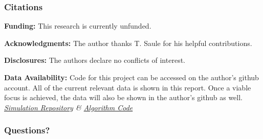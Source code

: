 \documentclass[aspectratio=169,t,xcolor=table]{beamer}
\begin{document}
\begin{frame}
    \frametitle{Citations}
    \vspace{-1.25em}
    \tiny
    \vspace{1em}
        \textbf{Funding:}
        This research is currently unfunded.
      
        \textbf{Acknowledgments:}
        The author thanks T. Saule
        for his helpful contributions.
      
        \textbf{Disclosures:}
        The authors declare no conflicts of interest.
      
        \textbf{Data Availability:} Code for this project can be accessed on the
        author's github account. All of the current relevant data is shown in this
        report. Once a viable focus is achieved, the data will also be shown in the
        author's github as well.\\\vspace{1em}
        \textit{\href{https://github.com/kevinlindstrom/RMT_Simulation}
            {Simulation Repository} \&
            \href{https://github.com/kevinlindstrom/RMT_SLM}
            {Algorithm Code}}
\end{frame}


\begin{frame}
    \frametitle{Questions?}
\end{frame}
\end{document}
